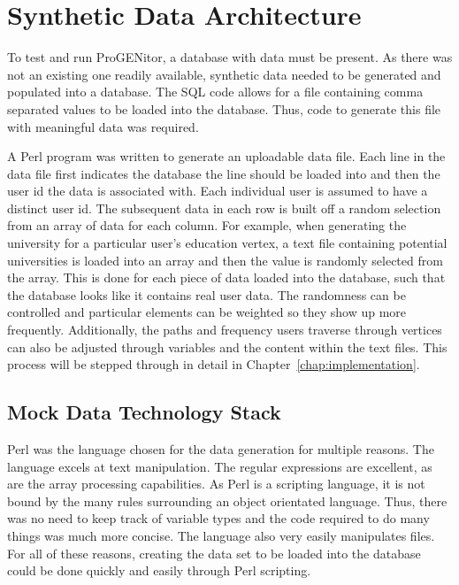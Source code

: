 \section{Synthetic Data Architecture}
	To test and run ProGENitor, a database with data must be present.  As there was
not an existing one readily available, synthetic data needed to be generated and
populated into a database.  The SQL code allows for a file containing comma
separated values to be loaded into the database.  Thus, code to generate this
file with meaningful data was required.  
	
A Perl program was written to generate an uploadable data file.  Each line in
the data file first indicates the database the line should be loaded into and
then the user id the data is associated with.  Each individual user is assumed
to have a distinct user id.  The subsequent data in each row is built off a
random selection from an array of data for each column.  For example, when
generating the university for a particular user's education vertex, a text file
containing potential universities is loaded into an array and then the value is
randomly selected from the array.  This is done for each piece of data loaded
into the database, such  that the database looks like it contains real user
data.  The randomness can be controlled and particular elements can be weighted
so they show up more frequently.  Additionally, the paths and frequency users
traverse through vertices can also be adjusted through variables and the content
within the text files.  This process will be stepped through in detail in
Chapter~\ref{chap:implementation}.

\subsection{Mock Data Technology Stack}
Perl was the language chosen for the data generation for multiple reasons.  The
language excels at text manipulation.  The regular expressions are excellent, as
are the array processing capabilities.  As Perl is a scripting language, it is
not bound by the many rules surrounding an object orientated language.  Thus,
there was no need to keep track of variable types and the code required to do
many things was much more concise.  The language also very easily manipulates
files.  For all of these reasons, creating the data set to be loaded into the
database could be done quickly and easily through Perl scripting.
